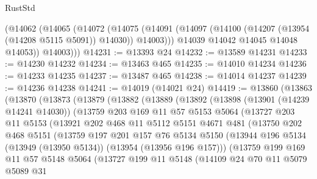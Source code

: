 \begin{lexlean}{RustStd}
\begin{coremodule}
        (@14062
          (@14065
            (@14072
              (@14075
                (@14091 (@14097 (@14100 (@14207 (@13954 (@14208 @5115 @5091)) @14030)) @14003)))
              @14039
              @14042
              @14045
              @14048
              @14053))
          @14003)))
@14231 := @13393 @24
@14232 := @13589 @14231
@14233 := @14230 @14232
@14234 := @13463 @465
@14235 := @14010 @14234
@14236 := @14233 @14235
@14237 := @13487 @465
@14238 := @14014 @14237
@14239 := @14236 @14238
@14241 := @14019 (@14021 @24)
@14419 := @13860
    (@13863
      (@13870
        (@13873
          (@13879
            (@13882
              (@13889
                (@13892
                  (@13898
                    (@13901 (@14239 @14241 @14030))
                    (@13759
                      @203
                      @169
                      @11
                      @57
                      @5153
                      @5064
                      (@13727
                        @203
                        @11
                        @5153
                        (@13921
                          @202
                          @468
                          @11
                          @5112
                          @5151
                          @4671
                          @481
                          (@13750
                            @202
                            @468
                            @5151
                            (@13759
                              @197
                              @201
                              @157
                              @76
                              @5134
                              @5150
                              (@13944
                                @196
                                @5134
                                (@13949 (@13950 @5134))
                                (@13954 (@13956 @196 @157)))
                              (@13759
                                @199
                                @169
                                @11
                                @57
                                @5148
                                @5064
                                (@13727
                                  @199
                                  @11
                                  @5148
                                  (@14109
                                    @24
                                    @70
                                    @11
                                    @5079
                                    @5089
                                    @31

\end{coremodule}
\end{lexlean}
